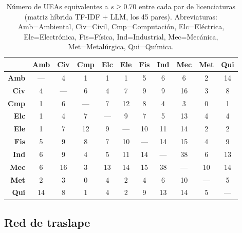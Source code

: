 \documentclass[11pt,a4paper]{article}
\begin{document}
\begin{table}[H]
\centering
\caption{Número de UEAs equivalentes a $s \geq 0.70$ entre cada par de licenciaturas
  (matriz híbrida TF-IDF + LLM, los 45 pares).
  Abreviaturas: Amb=Ambiental, Civ=Civil, Cmp=Computación, Elc=Eléctrica,
  Ele=Electrónica, Fis=Física, Ind=Industrial, Mec=Mecánica,
  Met=Metalúrgica, Qui=Química.}
\label{tab:matriz_interplan}
\footnotesize\setlength{\tabcolsep}{4pt}
\begin{tabular}{r *{10}{c}}
\toprule
 & \textbf{Amb} & \textbf{Civ} & \textbf{Cmp} & \textbf{Elc} & \textbf{Ele} & \textbf{Fis} & \textbf{Ind} & \textbf{Mec} & \textbf{Met} & \textbf{Qui} \\
\midrule
\textbf{Amb} & --- &  4 &  1 &  1 &  1 &  5 &  6 &  6 &  2 & 14 \\
\textbf{Civ} &  4  & --- &  6 &  4 &  7 &  9 &  9 & 16 &  3 &  8 \\
\textbf{Cmp} &  1  &  6  & --- &  7 & 12 &  8 &  4 &  3 &  0 &  1 \\
\textbf{Elc} &  1  &  4  &  7  & --- &  9 &  7 &  5 & 13 &  4 &  4 \\
\textbf{Ele} &  1  &  7  & 12  &  9  & --- & 10 & 11 & 14 &  2 &  2 \\
\textbf{Fis} &  5  &  9  &  8  &  7  & 10  & --- & 14 & 15 &  4 &  9 \\
\textbf{Ind} &  6  &  9  &  4  &  5  & 11  & 14  & --- & 38 &  6 & 13 \\
\textbf{Mec} &  6  & 16  &  3  & 13  & 14  & 15  & 38  & --- & 10 & 14 \\
\textbf{Met} &  2  &  3  &  0  &  4  &  2  &  4  &  6  & 10  & --- &  5 \\
\textbf{Qui} & 14  &  8  &  1  &  4  &  2  &  9  & 13  & 14  &  5  & --- \\
\bottomrule
\end{tabular}
\end{table}

\subsection{Red de traslape}
\label{sec:grafo}
\end{document}
